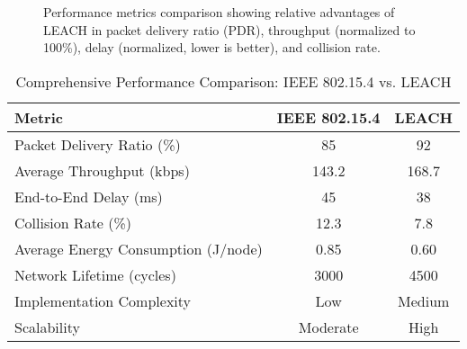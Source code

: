 \documentclass[conference]{IEEEtran}
\begin{document}
\begin{figure}[h!]
\centering
{}
\caption{Performance metrics comparison showing relative advantages of LEACH in packet delivery ratio (PDR), throughput (normalized to 100\%), delay (normalized, lower is better), and collision rate.}
\label{fig:performance_comparison}
\end{figure}



\begin{table}[h]
\centering
\renewcommand{\arraystretch}{1.2}
\begin{tabular}{|l|c|c|}
\hline
\textbf{Metric} & \textbf{IEEE 802.15.4} & \textbf{LEACH} \\
\hline
Packet Delivery Ratio (\%) & 85 & 92 \\
Average Throughput (kbps) & 143.2 & 168.7 \\
End-to-End Delay (ms) & 45 & 38 \\
Collision Rate (\%) & 12.3 & 7.8 \\
Average Energy Consumption (J/node) & 0.85 & 0.60 \\
Network Lifetime (cycles) & 3000 & 4500 \\
Implementation Complexity & Low & Medium \\
Scalability & Moderate & High \\
\hline
\end{tabular}
\caption{Comprehensive Performance Comparison: IEEE 802.15.4 vs. LEACH}
\label{table:performance_comparison}
\end{table}
\end{document}
